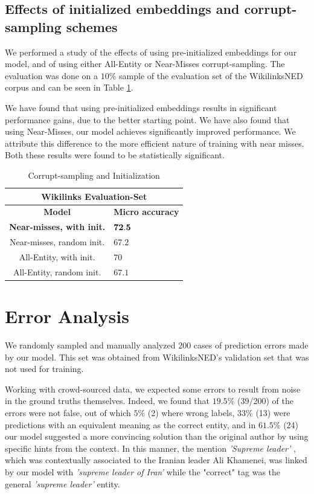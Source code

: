 \documentclass[11pt,a4paper]{article}
\begin{document}
	\subsection{Effects of initialized embeddings and corrupt-sampling schemes}
	\label{experiments:effect}
	
	We performed a study of the effects of using pre-initialized embeddings for our model, and of using either All-Entity or Near-Misses corrupt-sampling. The evaluation was done on a $10\%$ sample of the evaluation set of the WikilinksNED corpus and can be seen in Table \ref{tab:c}. 
	
	We have found that using pre-initialized embeddings results in significant performance gains, due to the better starting point. We have also found that using Near-Misses, our model achieves significantly improved performance. We attribute this difference to the more efficient nature of training with near misses. Both these results were found to be statistically significant.
	
	
	\begin{table}[ht]
		\begin{center}
			\begin{tabular}{|c| p{1.5cm}|}
				\hline \multicolumn{2}{|c|}{Wikilinks Evaluation-Set} \\
				\hline \bf Model & \bf Micro     accuracy  \\ \hline
				\bf Near-misses, with init. &  $\bf 72.5$ \\ 
				Near-misses, random init. & $67.2$ \\ 
				All-Entity, with init. & $70$ \\ 
				All-Entity, random init. & $67.1$ \\ 
				\hline
			\end{tabular}
		\end{center}
		\caption{\label{tab:c} Corrupt-sampling and Initialization}
	\end{table}
	
	
	\section{Error Analysis}
	
	We randomly sampled and manually analyzed $200$ cases of prediction errors made by our model. This set was obtained from WikilinksNED's validation set that was not used for training. 
	
	Working with crowd-sourced data, we expected some errors to result from noise in the ground truths themselves. Indeed, we found that $19.5$\% (39/200) of the errors were not false, out of which $5\%$ (2) where wrong labels, $33\%$ (13) were predictions with an equivalent meaning as the correct entity, and in $61.5\%$ (24) our model suggested a more convincing solution than the original author by using specific hints from the context. In this manner, the  mention \textit{'Supreme leader'} , which was contextually associated to the Iranian leader Ali Khamenei, was linked by our model with \textit{'supreme leader of Iran'} while the "correct" tag was the general \textit{'supreme leader'} entity.
	
\end{document}
